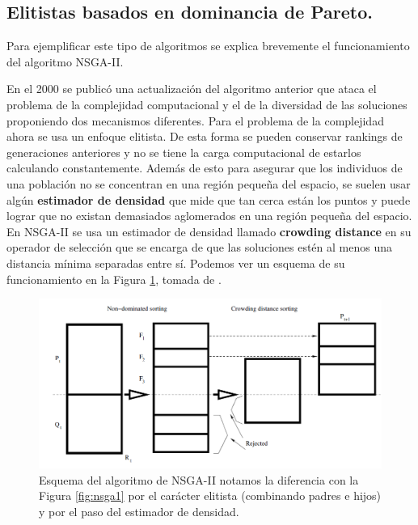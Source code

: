 \subsection*{Elitistas basados en dominancia de Pareto.} \label{sec:nsga2}

Para ejemplificar este tipo de algoritmos se explica brevemente el funcionamiento del algoritmo NSGA-II.  

En el 2000 se publicó \cite{debFastElitistNondominated2000} una actualización del algoritmo anterior que ataca el problema de la complejidad computacional y el de la diversidad de las soluciones proponiendo dos mecanismos diferentes. Para el problema de la complejidad ahora se usa un enfoque elitista. De esta forma se pueden conservar rankings de generaciones anteriores y no se tiene la carga computacional de estarlos calculando constantemente. Además de esto para asegurar que los individuos de una población no se concentran en una región pequeña del espacio, se suelen usar algún \textbf{estimador de densidad} que mide que tan cerca están los puntos y puede lograr que no existan demasiados aglomerados en una región pequeña del espacio. En NSGA-II se usa un estimador de densidad llamado \textbf{crowding distance} en su operador de selección que se encarga de que las soluciones estén al menos una distancia mínima separadas entre sí. Podemos ver un esquema de su funcionamiento en la Figura \ref{fig:nsga2}, tomada de \cite{coelloEvolutionaryAlgorithmsSolving}.

\begin{figure}[H]
    \centering
    \includegraphics[width=\textwidth]{Figuras/nsga2.png}
    \caption[NSGA-II]{Esquema del algoritmo de NSGA-II notamos la diferencia con la Figura \ref{fig:nsga1} por el carácter elitista (combinando padres e hijos) y por el paso del estimador de densidad.}
    \label{fig:nsga2}
\end{figure}

